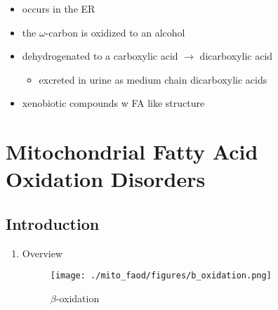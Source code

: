 \documentclass{scrartcl}
\begin{document}
\begin{enumerate}
\begin{itemize}
\item occurs in the ER
\item the \(\omega\)-carbon is oxidized to an alcohol
\item dehydrogenated to a carboxylic acid \(\to\) dicarboxylic acid
\begin{itemize}
\item excreted in urine as medium chain dicarboxylic acids
\end{itemize}
\item xenobiotic compounds w FA like structure
\end{itemize}
\end{enumerate}
\section{Mitochondrial Fatty Acid Oxidation Disorders}
\label{sec:org4979ee1}
\subsection{Introduction}
\label{sec:orgcc73b63}
\begin{enumerate}
\item Overview
\label{sec:orgfc6bc7e}
\begin{figure}[htbp]
\centering
\texttt{[image: ./mito\_faod/figures/b\_oxidation.png]}
\caption{\label{fig:orgbc252cb}
\(\beta\)-oxidation}
\end{figure}
\end{enumerate}
\end{document}
